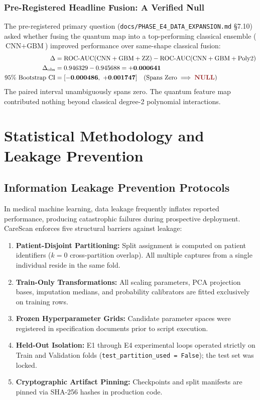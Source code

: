 \documentclass[11pt,a4paper]{report}
\newcommand{\artifact}[1]{\texttt{\footnotesize #1}}
\newcommand{\vnull}{\textcolor{csred}{\textbf{NULL}}}
\begin{document}
\subsection{Pre-Registered Headline Fusion: A Verified Null}
The pre-registered primary question (\artifact{docs/PHASE\_E4\_DATA\_EXPANSION.md} \S7.10) asked whether fusing the quantum map into a top-performing classical ensemble ($\text{CNN} + \text{GBM}$) improved performance over same-shape classical fusion:
\begin{align}
  \Delta &= \text{ROC-AUC}(\text{CNN} + \text{GBM} + \text{ZZ}) - \text{ROC-AUC}(\text{CNN} + \text{GBM} + \text{Poly2}) \nonumber \\
  \Delta_\text{obs} &= 0.946329 - 0.945688 = \mathbf{+0.000641} \nonumber \\
  95\% \ \text{Bootstrap CI} &= \mathbf{[-0.000486, \ +0.001747]} \quad (\text{Spans Zero} \implies \vnull)
\end{align}
The paired interval unambiguously spans zero. The quantum feature map contributed nothing beyond classical degree-2 polynomial interactions.

\chapter{Statistical Methodology and Leakage Prevention}

\section{Information Leakage Prevention Protocols}
In medical machine learning, data leakage frequently inflates reported performance, producing catastrophic failures during prospective deployment. CareScan enforces five structural barriers against leakage:
\begin{enumerate}
  \item \textbf{Patient-Disjoint Partitioning:} Split assignment is computed on patient identifiers ($k=0$ cross-partition overlap). All multiple captures from a single individual reside in the same fold.
  \item \textbf{Train-Only Transformations:} All scaling parameters, PCA projection bases, imputation medians, and probability calibrators are fitted exclusively on training rows.
  \item \textbf{Frozen Hyperparameter Grids:} Candidate parameter spaces were registered in specification documents prior to script execution.
  \item \textbf{Held-Out Isolation:} E1 through E4 experimental loops operated strictly on Train and Validation folds (\texttt{test\_partition\_used = False}); the test set was locked.
  \item \textbf{Cryptographic Artifact Pinning:} Checkpoints and split manifests are pinned via SHA-256 hashes in production code.
\end{enumerate}
\end{document}

